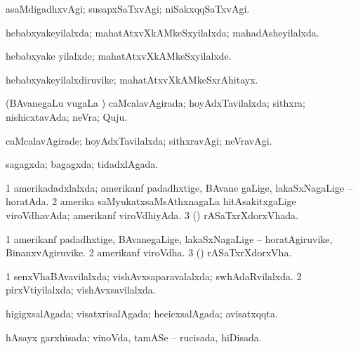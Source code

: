 \bentry
{} 
\gl{\kirxvi}
\expl{}
\bmng
asaMdigadhxvAgi; susapxSaTxvAgi; niSakxqqSaTxvAgi. 
\emng
\eentry

\bentry
{} 
\gl{\gu}
\expl{}
\bmng
hebabxyakeyilalxda; mahatAtxvXkAMkeSxyilalxda; mahadAsheyilalxda. 
\emng
\eentry

\bentry
{} 
\gl{\kirxvi}
\expl{}
\bmng
hebabxyake yilalxde; mahatAtxvXkAMkeSxyilalxde. 
\emng
\eentry

\bentry
{} 
\gl{\nA}
\expl{}
\bmng
hebabxyakeyilalxdiruvike; mahatAtxvXkAMkeSxrAhitayx. 
\emng
\eentry

\bentry
{} 
\gl{\gu}
\expl{}
\bmng
(BAvanegaLu \mo vugaLa \vi) caMcalavAgirada; hoyAdxTavilalxda; sithxra; nishicxtavAda; neVra; Quju. 
\emng
\eentry

\bentry
{} 
\gl{\kirxvi}
\expl{}
\bmng
caMcalavAgirade; hoyAdxTavilalxda; sithxravAgi; neVravAgi. 
\emng
\eentry

\bentry
{} 
\gl{\gu}
\expl{}
\bmng
sagagxda; bagagxda; tidadxlAgada. 
\emng
\eentry

\bentry
{} 
\gl{\gu}
\expl{}
\bmng
\bnum
\num{1} amerikadadxlalxda; amerikanf padadhxtige, BAvane gaLige, lakaSxNagaLige -- horatAda. 
\num{2} amerika saMyukatxsaMsAthxnagaLa hitAsakitxgaLige viroVdhavAda; amerikanf viroVdhiyAda. 
\num{3} (\ame) rASaTxrXdorxVhada. 
\enum
\emng
\eentry

\bentry
{} 
\gl{\nA}
\expl{}
\bmng
\bnum
\num{1} amerikanf padadhxtige, BAvanegaLige, lakaSxNagaLige -- horatAgiruvike, BinanxvAgiruvike. 
\num{2} amerikanf viroVdha. 
\num{3} (\ame) rASaTxrXdorxVha. 
\enum
\emng
\eentry

\bentry
{} 
\gl{\gu}
\expl{}
\bmng
\bnum
\num{1} senxVhaBAvavilalxda; vishAvxsaparavalalxda; swhAdaRvilalxda. 
\num{2} pirxVtiyilalxda; vishAvxsavilalxda. 
\enum
\emng
\eentry

\bentry
{} 
\gl{\gu}
\expl{}
\bmng
higigxsalAgada; visatxrisalAgada; hecicxsalAgada; avisatxqqta. 
\emng
\eentry

\bentry
{} 
\gl{\gu}
\expl{}
\bmng
hAsayx garxhisada; vinoVda, tamASe -- rucisada, hiDisada. 
\emng
\eentry

